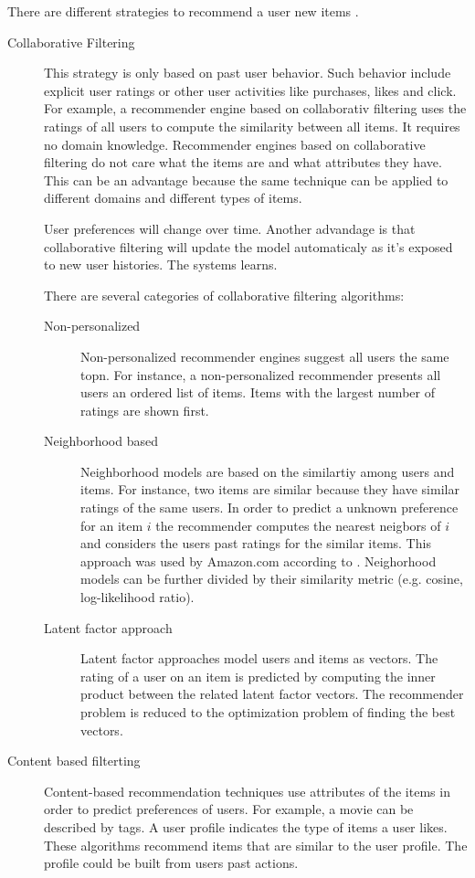 There are different strategies to recommend a user new items \cite{jannach11}.
\begin{description}
\item[Collaborative Filtering] This strategy is only based on past user behavior. Such behavior include explicit user ratings or other user activities like purchases, likes and click. For example, a recommender engine based on collaborativ filtering uses the ratings of all users to compute the similarity between all items. 
It requires no domain knowledge. Recommender engines based on collaborative filtering do not care what the items are and what attributes they have. This can be an advantage because the same technique can be applied to different domains and different types of items. 

User preferences will change over time. Another advandage is that collaborative filtering will update the model automaticaly as it's exposed to new user histories. The systems learns.

There are several categories of collaborative filtering algorithms:
\begin{description}
\item[Non-personalized] Non-personalized recommender engines suggest all users the same \gls{topn}. For instance, a non-personalized recommender presents all users an ordered list of items. Items with the largest number of ratings are shown first.
\item[Neighborhood based] Neighborhood models are based on the similartiy among users and items. For instance, two items are similar because they have similar ratings of the same users. In order to predict a unknown preference for an item $i$ the recommender computes the nearest neigbors of $i$ and considers the users past ratings for the similar items. This approach was used by Amazon.com according to \cite{Linden}. Neighorhood models can be further divided by their similarity metric (e.g. cosine, log-likelihood ratio).
\item[Latent factor approach] Latent factor approaches model users and items as vectors. The rating of a user on an item is predicted by computing the inner product between the related latent factor vectors. The recommender problem is reduced to the optimization problem of finding the best vectors.
\end{description}
\item[Content based filterting] Content-based recommendation techniques use attributes of the items in order to predict preferences of users. For example, a movie can be described by \glspl{tag}. A user profile indicates the type of items a user likes. These algorithms recommend items that are similar to the user profile. The profile could be built from users past actions.
\end{description}

